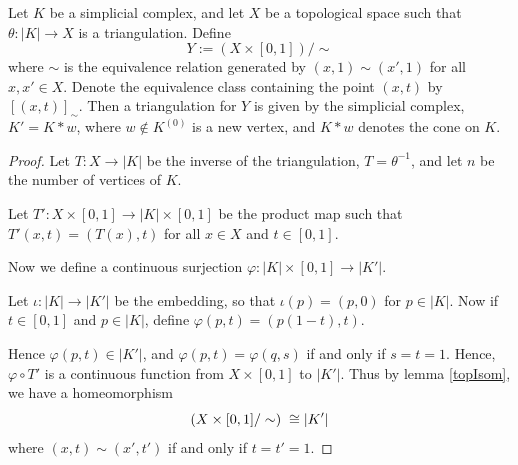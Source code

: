 \documentclass{unswmaths}
\begin{document}
\begin{proposition}
    Let $K$ be a simplicial complex, and let $X$ be a topological
    space such that $\theta:|K|\rightarrow X$ is a triangulation. 
    Define
    \begin{equation*}
        Y := (X \times [0,1])/\sim
    \end{equation*}
    where $\sim$ is the equivalence relation generated by $(x,1) \sim (x',1)$
    for all $x,x' \in X$. Denote the equivalence class containing the point $(x,t)$
    by $[(x,t)]_\sim$.
    Then a triangulation for $Y$ is given by the simplicial complex, $K' = K*w$,
    where $w \notin K^{(0)}$ is a new vertex, and $K*w$ denotes the cone
    on $K$.
\end{proposition}
\begin{proof}
    Let $T:X\rightarrow |K|$ be the inverse of the triangulation, $T = \theta^{-1}$,
    and let $n$ be the number of vertices of $K$. 
    
    Let $T':X\times [0,1]\rightarrow |K|\times [0,1]$ be the product map 
    such that $T'(x,t) = (T(x),t)$ for all $x \in X$ and $t \in [0,1]$.
    
    Now we define a continuous surjection $\varphi: |K| \times [0,1] \rightarrow |K'|$.
    
    Let $\iota:|K|\rightarrow |K'|$ be the embedding, so that $\iota(p) = (p,0)$
    for $p \in |K|$. Now if $t \in [0,1]$ and $p \in |K|$, define $\varphi(p,t) = (p(1-t),t)$.
    
    Hence $\varphi(p,t) \in |K'|$, and $\varphi(p,t) = \varphi(q,s)$ if and only
    if $s = t = 1$. Hence, $\varphi\circ T'$ is a continuous function
    from $X\times [0,1]$ to $|K'|$. Thus by lemma \ref{topIsom}, we have a homeomorphism
    \begin{equation*}
        (X\times [0,1]/\sim)\; \cong |K'|
    \end{equation*}
    where $(x,t) \sim (x',t')$ if and only if $t = t' = 1$.
    
\end{proof}
\end{document}
